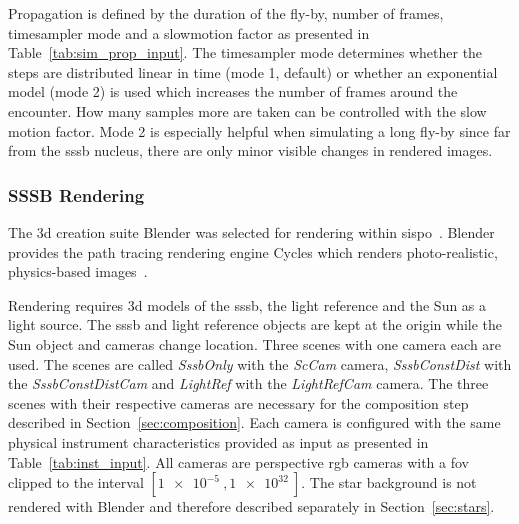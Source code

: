 Propagation is defined by the duration of the fly-by, number of frames, timesampler mode and a slowmotion factor as presented in Table~\ref{tab:sim_prop_input}. The timesampler mode determines whether the steps are distributed linear in time (mode 1, default) or whether an exponential model (mode 2) is used which increases the number of frames around the encounter. How many samples more are taken can be controlled with the slow motion factor. Mode 2 is especially helpful when simulating a long fly-by since far from the \gls{sssb} nucleus, there are only minor visible changes in rendered images.

\begin{table}[htb]
    \centering
    \caption{Input parameters that define the propagation step in~\gls{sispo}.}
    \label{tab:sim_prop_input}
\end{table}


\subsubsection{SSSB Rendering}
The \gls{3d} creation suite Blender was selected for rendering within \gls{sispo}~\cite{blender}. Blender provides the path tracing rendering engine Cycles which renders photo-realistic, physics-based images~\cite{Cycles}.

Rendering requires \gls{3d} models of the \gls{sssb}, the light reference and the Sun as a light source. The \gls{sssb} and light reference objects are kept at the origin while the Sun object and cameras change location. Three scenes with one camera each are used. The scenes are called \textit{SssbOnly} with the \textit{ScCam} camera, \textit{SssbConstDist} with the \textit{SssbConstDistCam} and \textit{LightRef} with the \textit{LightRefCam} camera. The three scenes with their respective cameras are necessary for the composition step described in Section~\ref{sec:composition}. Each camera is configured with the same physical instrument characteristics provided as input as presented in Table~\ref{tab:inst_input}. All cameras are perspective \gls{rgb} cameras with a \gls{fov} clipped to the interval $[\SI{1e-5}{},\SI{1e32}{}]$. The star background is not rendered with Blender and therefore described separately in Section~\ref{sec:stars}.


